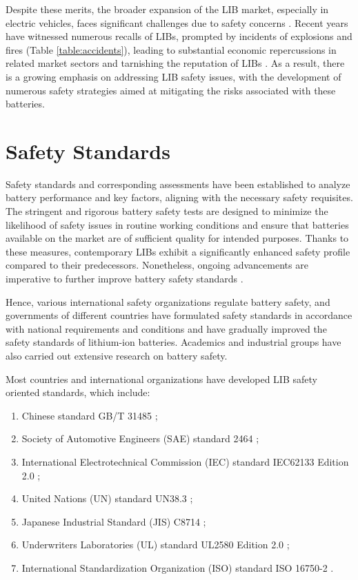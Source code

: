 Despite these merits, the broader expansion of the LIB market, especially in electric vehicles, faces significant challenges due to safety concerns \cite{love2018innovating,schipper2016recent,feng2018thermal}. Recent years have witnessed numerous recalls of LIBs, prompted by incidents of explosions and fires (Table \ref{table:accidents}), leading to substantial economic repercussions in related market sectors and tarnishing the reputation of LIBs \cite{chen2021review,balakrishnan2006safety}. As a result, there is a growing emphasis on addressing LIB safety issues, with the development of numerous safety strategies aimed at mitigating the risks associated with these batteries.

\section{Safety Standards}
\label{sec:safety-standards}

Safety standards and corresponding assessments have been established to analyze battery performance and key factors, aligning with the necessary safety requisites. The stringent and rigorous battery safety tests are designed to minimize the likelihood of safety issues in routine working conditions and ensure that batteries available on the market are of sufficient quality for intended purposes. Thanks to these measures, contemporary LIBs exhibit a significantly enhanced safety profile compared to their predecessors. Nonetheless, ongoing advancements are imperative to further improve battery safety standards \cite{chen2021review}.

Hence, various international safety organizations regulate battery safety, and governments of different countries have formulated safety standards in accordance with national requirements and conditions and have gradually improved the safety standards of lithium-ion batteries. Academics and industrial groups have also carried out extensive research on battery safety.

Most countries and international organizations have developed LIB safety oriented standards, which include:
\begin{enumerate}
    \item Chinese standard GB/T 31485 \cite{};
    \item Society of Automotive Engineers (SAE) standard 2464 \cite{};
    \item International Electrotechnical Commission (IEC) standard IEC62133 Edition 2.0 \cite{};
    \item United Nations (UN) standard UN38.3 \cite{};
    \item Japanese Industrial Standard (JIS) C8714 \cite{};
    \item Underwriters Laboratories (UL) standard UL2580 Edition 2.0 \cite{};
    \item International Standardization Organization (ISO) standard ISO 16750-2 \cite{}.
\end{enumerate}

